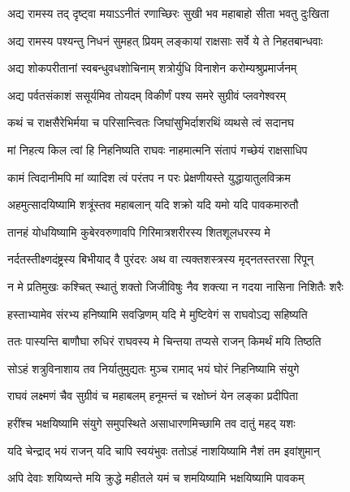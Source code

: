 \twolineshloka
{अद्य रामस्य तद् दृष्ट्वा मयाऽऽनीतं रणाच्छिरः}
{सुखी भव महाबाहो सीता भवतु दुःखिता} %

\twolineshloka
{अद्य रामस्य पश्यन्तु निधनं सुमहत् प्रियम्}
{लङ्कायां राक्षसाः सर्वे ये ते निहतबान्धवाः} %

\twolineshloka
{अद्य शोकपरीतानां स्वबन्धुवधशोचिनाम्}
{शत्रोर्युधि विनाशेन करोम्यश्रुप्रमार्जनम्} %

\twolineshloka
{अद्य पर्वतसंकाशं ससूर्यमिव तोयदम्}
{विकीर्णं पश्य समरे सुग्रीवं प्लवगेश्वरम्} %

\twolineshloka
{कथं च राक्षसैरेभिर्मया च परिसान्त्वितः}
{जिघांसुभिर्दाशरथिं व्यथसे त्वं सदानघ} %

\twolineshloka
{मां निहत्य किल त्वां हि निहनिष्यति राघवः}
{नाहमात्मनि संतापं गच्छेयं राक्षसाधिप} %

\twolineshloka
{कामं त्विदानीमपि मां व्यादिश त्वं परंतप}
{न परः प्रेक्षणीयस्ते युद्धायातुलविक्रम} %

\twolineshloka
{अहमुत्सादयिष्यामि शत्रूंस्तव महाबलान्}
{यदि शक्रो यदि यमो यदि पावकमारुतौ} %

\twolineshloka
{तानहं योधयिष्यामि कुबेरवरुणावपि}
{गिरिमात्रशरीरस्य शितशूलधरस्य मे} %

\twolineshloka
{नर्दतस्तीक्ष्णदंष्ट्रस्य बिभीयाद् वै पुरंदरः}
{अथ वा त्यक्तशस्त्रस्य मृद्नतस्तरसा रिपून्} %

\twolineshloka
{न मे प्रतिमुखः कश्चित् स्थातुं शक्तो जिजीविषुः}
{नैव शक्त्या न गदया नासिना निशितैः शरैः} %

\twolineshloka
{हस्ताभ्यामेव संरभ्य हनिष्यामि सवज्रिणम्}
{यदि मे मुष्टिवेगं स राघवोऽद्य सहिष्यति} %

\twolineshloka
{ततः पास्यन्ति बाणौघा रुधिरं राघवस्य मे}
{चिन्तया तप्यसे राजन् किमर्थं मयि तिष्ठति} %

\twolineshloka
{सोऽहं शत्रुविनाशाय तव निर्यातुमुद्यतः}
{मुञ्च रामाद् भयं घोरं निहनिष्यामि संयुगे} %

\twolineshloka
{राघवं लक्ष्मणं चैव सुग्रीवं च महाबलम्}
{हनूमन्तं च रक्षोघ्नं येन लङ्का प्रदीपिता} %

\twolineshloka
{हरींश्च भक्षयिष्यामि संयुगे समुपस्थिते}
{असाधारणमिच्छामि तव दातुं महद् यशः} %

\twolineshloka
{यदि चेन्द्राद् भयं राजन् यदि चापि स्वयंभुवः}
{ततोऽहं नाशयिष्यामि नैशं तम इवांशुमान्} %

\twolineshloka
{अपि देवाः शयिष्यन्ते मयि क्रुद्धे महीतले}
{यमं च शमयिष्यामि भक्षयिष्यामि पावकम्} %

